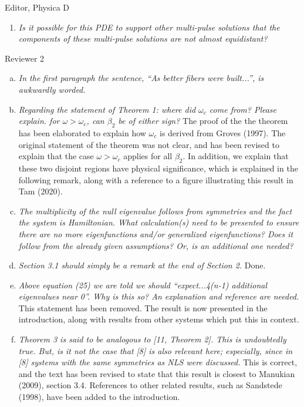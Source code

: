\documentclass[11pt]{letter}
\begin{document}
\begin{letter}{Editor, Physica D}
\begin{enumerate}
\item \emph{Is it possible for this PDE to support other multi-pulse solutions that the components of these multi-pulse solutions are not almost equidistant?}
\vspace{4mm}
\end{enumerate}

Reviewer 2
\begin{enumerate}[(a)]
\item \emph{In the first paragraph the sentence, ``As better fibers were built...'', is awkwardly worded.}
\vspace{4mm}

\item \emph{Regarding the statement of Theorem 1: where did $\omega_c$ come from? Please explain.
for $\omega > \omega_c$, can $\beta_2$ be of either sign?} The proof of the the theorem has been elaborated to explain how $\omega_c$ is derived from Groves (1997). The original statement of the theorem was not clear, and has been revised to explain that the case $\omega > \omega_c$ applies for all $\beta_2$. In addition, we explain that these two disjoint regions have physical significance, which is explained in the following remark, along with a reference to a figure illustrating this result in Tam (2020).
\vspace{4mm}

\item \emph{The multiplicity of the null eigenvalue follows from symmetries and the fact the system is Hamiltonian. What calculation(s) need to be presented to ensure there are no more eigenfunctions and/or generalized eigenfunctions? Does it follow from the already given assumptions? Or, is an additional one needed?}
\vspace{4mm}

\item \emph{Section 3.1 should simply be a remark at the end of Section 2.} Done.
\vspace{4mm}

\item \emph{Above equation (25) we are told we should ``expect...4(n-1) additional eigenvalues  near 0''. Why is this so? An explanation and reference are needed.} This statement has been removed. The result is now presented in the introduction, along with results from other systems which put this in context.
\vspace{4mm}

\item \emph{Theorem 3 is said to be analogous to [11, Theorem 2]. This is undoubtedly true. But, is it not the case that [8] is also relevant here; especially, since in [8] systems with the same symmetries as NLS were discussed.} This is correct, and the text has been revised to state that this result is closest to Manukian (2009), section 3.4. References to other related results, such as Sandstede (1998), have been added to the introduction.
\vspace{4mm}


\end{enumerate}
\end{letter}
\end{document}
